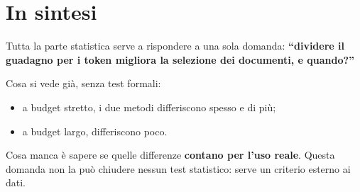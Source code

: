 \documentclass[11pt,a4paper]{article}
\begin{document}
\section{In sintesi}

Tutta la parte statistica serve a rispondere a una sola domanda: \textbf{``dividere il guadagno per i token migliora la selezione dei documenti, e quando?''}

Cosa si vede già, senza test formali:
\begin{itemize}
  \item a budget stretto, i due metodi differiscono spesso e di più;
  \item a budget largo, differiscono poco.
\end{itemize}

Cosa manca è sapere se quelle differenze \textbf{contano per l'uso reale}. Questa domanda non la può chiudere nessun test statistico: serve un criterio esterno ai dati.
\end{document}
